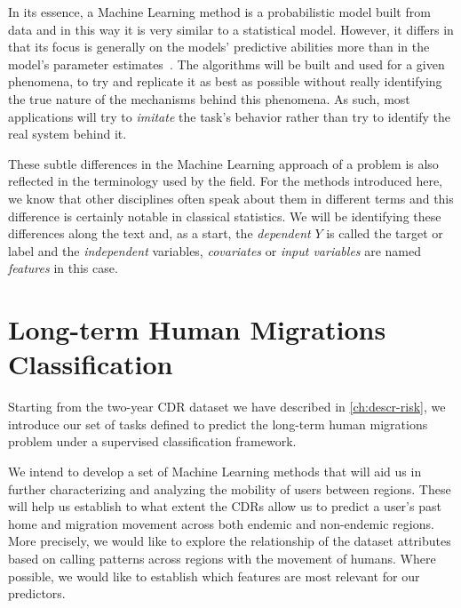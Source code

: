 In its essence, a Machine Learning method is a probabilistic model built from data and in this way it is very similar to a statistical model.
However, it differs in that its focus is generally on the models' predictive abilities more than in the model's parameter estimates~\citep{breiman-statisticalmodeling}.
The algorithms will be built and used for a given phenomena, to try and replicate it as best as possible without really identifying the true nature of the mechanisms behind this phenomena.
As such, most applications will try to \textit{imitate} the task's behavior rather than try to identify the real system behind it.


These subtle differences in the Machine Learning approach of a problem is also reflected in the terminology used by the field.
For the methods introduced here, we know that other disciplines often speak about them in different terms and this difference is certainly notable in classical statistics.
We will be identifying these differences along the text and, as a start, the \textit{dependent} $Y$ is called the target or label and the \textit{independent} variables, \textit{covariates} or \textit{input variables} are named \textit{features} in this case.

\section{Long-term Human Migrations Classification}\label{long_term}

Starting from the two-year CDR dataset we have described in \cref{ch:descr-risk}, we introduce our set of tasks defined to predict the long-term human migrations problem under a supervised classification framework.

We intend to develop a set of Machine Learning methods that will aid us in further characterizing and analyzing the mobility of users between regions.
These will help us establish to what extent the CDRs allow us to predict a user's past home and migration movement across both endemic and non-endemic regions.
More precisely, we would like to explore the relationship of the dataset attributes based on calling patterns across regions with the movement of humans.
Where possible, we would like to establish which features are most relevant for our predictors.

